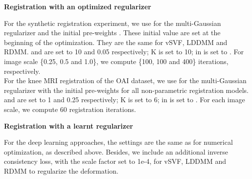 \documentclass{article}
\numberwithin{equation}{section}
\begin{document}
{\bf Registration with an optimized regularizer}

For the synthetic registration experiment, we use  for the multi-Gaussian regularizer and the initial pre-weights . These initial value are set at the beginning of the optimization. They are the same for vSVF, LDDMM and RDMM.  and  are set to 10 and 0.05 respectively; K is set to 10;  in  is set to . For image scale \{0.25, 0.5 and 1.0\}, we  compute \{100, 100 and 400\} iterations, respectively.\\
For the knee MRI registration of the OAI dataset, we use  for the multi-Gaussian regularizer with the initial pre-weights  for all non-parametric registration models.   and  are set to 1 and 0.25 respectively; K is set to 6;  in  is set to . For each image scale, we compute 60 registration iterations.

{\bf Registration with a learnt regularizer} 

For the deep learning approaches, the settings are the same as for numerical optimization, as described above. Besides, we include an additional inverse consistency loss, with the scale factor set to 1e-4, for vSVF, LDDMM and RDMM to regularize the deformation.
\end{document}
